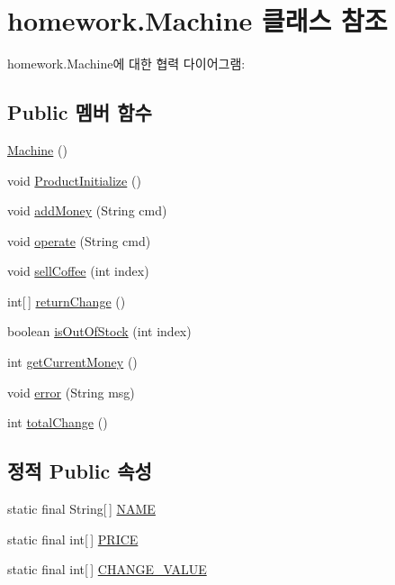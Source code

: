 \hypertarget{classhomework_1_1_machine}{}\section{homework.\+Machine 클래스 참조}
\label{classhomework_1_1_machine}


homework.\+Machine에 대한 협력 다이어그램\+:
\subsection*{Public 멤버 함수}
\begin{DoxyCompactItemize}
\item 
\hyperlink{classhomework_1_1_machine_ae7653ea4accf5f2bf4c32f9142a35021}{Machine} ()
\item 
void \hyperlink{classhomework_1_1_machine_aa5f532ad515e8e5050b29780c00de43b}{Product\+Initialize} ()
\item 
void \hyperlink{classhomework_1_1_machine_a44fdb1f6f3fd0e74f68710a0a0c6b271}{add\+Money} (String cmd)
\item 
void \hyperlink{classhomework_1_1_machine_a1ccaad959f3ab4d350ed201cc2c01151}{operate} (String cmd)
\item 
void \hyperlink{classhomework_1_1_machine_a81525289e52f27b3451a180d19f26e33}{sell\+Coffee} (int index)
\item 
int\mbox{[}$\,$\mbox{]} \hyperlink{classhomework_1_1_machine_a539000dc4362b85e3c4390c799fa4e32}{return\+Change} ()
\item 
boolean \hyperlink{classhomework_1_1_machine_a7aea2c95a5444015f3cb1c0b69376852}{is\+Out\+Of\+Stock} (int index)
\item 
int \hyperlink{classhomework_1_1_machine_ab9880b76766fab93570c25e619a499f9}{get\+Current\+Money} ()
\item 
void \hyperlink{classhomework_1_1_machine_a1d7f4ae53f4a73b94c1f7948637abe56}{error} (String msg)
\item 
int \hyperlink{classhomework_1_1_machine_a6871460a79f45dda54336ec2a4554550}{total\+Change} ()
\end{DoxyCompactItemize}
\subsection*{정적 Public 속성}
\begin{DoxyCompactItemize}
\item 
static final String\mbox{[}$\,$\mbox{]} \hyperlink{classhomework_1_1_machine_acc0990993af94d5daf7927b4553256f4}{N\+A\+ME}
\item 
static final int\mbox{[}$\,$\mbox{]} \hyperlink{classhomework_1_1_machine_a7b0f75289547dfd0aa81f1d842d9c7e4}{P\+R\+I\+CE}
\item 
static final int\mbox{[}$\,$\mbox{]} \hyperlink{classhomework_1_1_machine_ab52b84064804f444c66656c109a17ce0}{C\+H\+A\+N\+G\+E\+\_\+\+V\+A\+L\+UE}
\end{DoxyCompactItemize}
